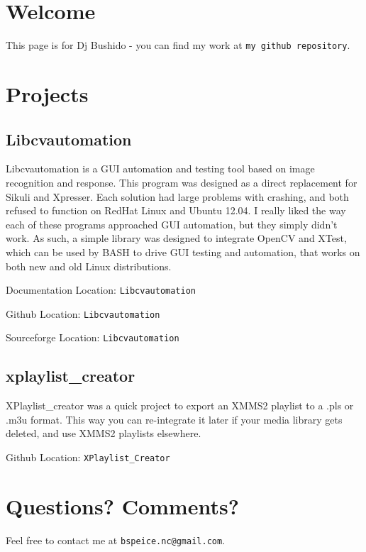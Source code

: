 \section{Welcome}\label{index_welcome}
This page is for Dj Bushido - you can find my work at {\tt my github repository}. \section{Projects}\label{index_projects}
\subsection{Libcvautomation}\label{index_libcvautomation}
Libcvautomation is a GUI automation and testing tool based on image recognition and response. This program was designed as a direct replacement for Sikuli and Xpresser. Each solution had large problems with crashing, and both refused to function on Red\-Hat Linux and Ubuntu 12.04. I really liked the way each of these programs approached GUI automation, but they simply didn't work. As such, a simple library was designed to integrate Open\-CV and XTest, which can be used by BASH to drive GUI testing and automation, that works on both new and old Linux distributions.

Documentation Location: {\tt Libcvautomation}

Github Location: {\tt Libcvautomation}

Sourceforge Location: {\tt Libcvautomation}\subsection{xplaylist\_\-creator}\label{index_xplaylistcreator}
XPlaylist\_\-creator was a quick project to export an XMMS2 playlist to a .pls or .m3u format. This way you can re-integrate it later if your media library gets deleted, and use XMMS2 playlists elsewhere.

Github Location: {\tt XPlaylist\_\-Creator}\section{Questions? Comments?}\label{index_questions}
Feel free to contact me at {\tt bspeice.nc@gmail.com}. 